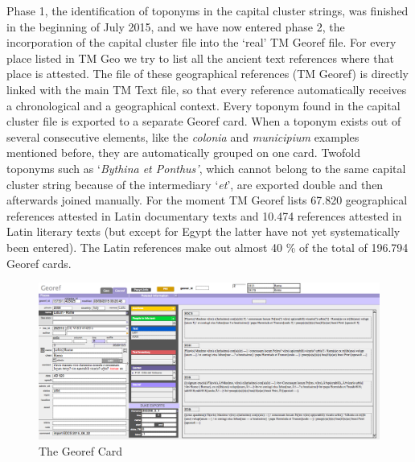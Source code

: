 \documentclass[amsthm,ebook]{saparticle}
\begin{document}
Phase 1, the identification of toponyms in the capital cluster strings, was finished in the beginning of July 2015,
and we have now entered phase 2, the incorporation of the capital cluster file into the `real' TM Georef file. For
every place listed in TM Geo we try to list all the ancient text references where that place is attested. The file of
these geographical references (TM Georef) is directly linked with the main TM Text file, so that every reference
automatically receives a chronological and a geographical context. Every toponym found in the capital cluster file is
exported to a separate Georef card. When a toponym exists out of several consecutive elements, like the \emph{colonia} and
\emph{municipium} examples mentioned before, they are automatically grouped on one card. Twofold toponyms such as `\emph{Bythina et
Ponthus'}, which cannot belong to the same capital cluster string because of the intermediary `\emph{et}', are exported double
and then afterwards joined manually. For the moment TM Georef lists 67.820 geographical references attested in Latin
documentary texts and 10.474 references attested in Latin literary texts (but except for Egypt the latter have not yet
systematically been entered). The Latin references make out almost 40 \% of the total of 196.794 Georef cards.




\begin{figure}[!hbp]
\centering
 \includegraphics[width=\columnwidth]{EAGLE2016FullPaperVerreth-img002.png}
\caption{The Georef Card}
\label{fig:2}
\end{figure}
\end{document}

